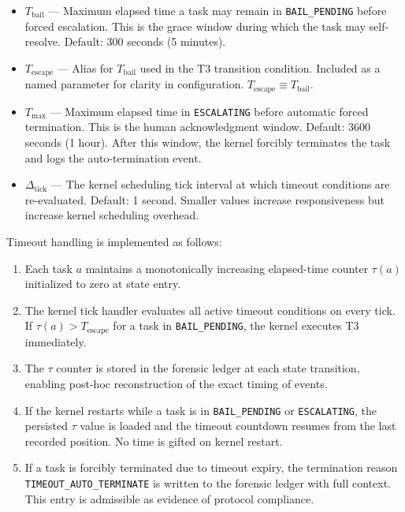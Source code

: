 \begin{itemize}
\item \textbf{$T_\text{bail}$} — Maximum elapsed time a task may remain in \texttt{BAIL\_PENDING} before forced escalation. This is the grace window during which the task may self-resolve. Default: 300 seconds (5 minutes).

\item \textbf{$T_\text{escape}$} — Alias for $T_\text{bail}$ used in the T3 transition condition. Included as a named parameter for clarity in configuration. $T_\text{escape} \equiv T_\text{bail}$.

\item \textbf{$T_\text{max}$} — Maximum elapsed time in \texttt{ESCALATING} before automatic forced termination. This is the human acknowledgment window. Default: 3600 seconds (1 hour). After this window, the kernel forcibly terminates the task and logs the auto-termination event.

\item \textbf{$\Delta_\text{tick}$} — The kernel scheduling tick interval at which timeout conditions are re-evaluated. Default: 1 second. Smaller values increase responsiveness but increase kernel scheduling overhead.
\end{itemize}

Timeout handling is implemented as follows:
\begin{enumerate}
\item Each task $a$ maintains a monotonically increasing elapsed-time counter $\tau(a)$ initialized to zero at state entry.
\item The kernel tick handler evaluates all active timeout conditions on every tick. If $\tau(a) > T_\text{escape}$ for a task in \texttt{BAIL\_PENDING}, the kernel executes T3 immediately.
\item The $\tau$ counter is stored in the forensic ledger at each state transition, enabling post-hoc reconstruction of the exact timing of events.
\item If the kernel restarts while a task is in \texttt{BAIL\_PENDING} or \texttt{ESCALATING}, the persisted $\tau$ value is loaded and the timeout countdown resumes from the last recorded position. No time is gifted on kernel restart.
\item If a task is forcibly terminated due to timeout expiry, the termination reason \texttt{TIMEOUT\_AUTO\_TERMINATE} is written to the forensic ledger with full context. This entry is admissible as evidence of protocol compliance.
\end{enumerate}


